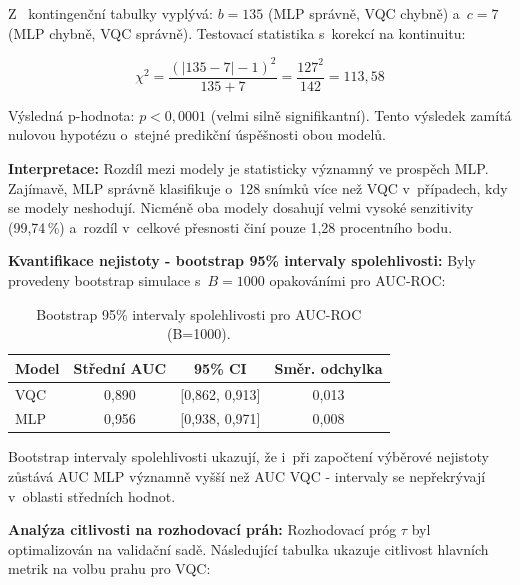 \documentclass[12pt, a4paper]{report}
\begin{document}
Z ~kontingenční tabulky vyplývá: $b = 135$ (MLP správně, VQC chybně) a~$c = 7$ (MLP chybně, VQC správně). Testovací statistika s~korekcí na kontinuitu:

\begin{equation}
    \chi^2 = \frac{(|135 - 7| - 1)^2}{135 + 7} = \frac{127^2}{142} = 113{,}58
\end{equation}

Výsledná p-hodnota: $p < 0{,}0001$ (velmi silně signifikantní). Tento výsledek zamítá nulovou hypotézu o~stejné predikční úspěšnosti obou modelů.

\textbf{Interpretace:} Rozdíl mezi modely je statisticky významný ve prospěch MLP. Zajímavě, MLP správně klasifikuje o~128 snímků více než VQC v~případech, kdy se modely neshodují. Nicméně oba modely dosahují velmi vysoké senzitivity (99,74\,\%) a~rozdíl v~celkové přesnosti činí pouze 1,28 procentního bodu.

\textbf{Kvantifikace nejistoty - bootstrap 95\% intervaly spolehlivosti:}
Byly provedeny bootstrap simulace s~$B = 1000$ opakováními pro AUC-ROC:

\begin{table}[htbp]
    \centering
    \caption{Bootstrap 95\% intervaly spolehlivosti pro AUC-ROC (B=1000).}
    \label{tab:bootstrap_ci}
    \begin{tabular}{|l|c|c|c|}
        \hline
        \textbf{Model} & \textbf{Střední AUC} & \textbf{95\% CI} & \textbf{Směr. odchylka} \\
        \hline
        VQC & 0{,}890 & [0{,}862, 0{,}913] & 0{,}013 \\
        \hline
        MLP & 0{,}956 & [0{,}938, 0{,}971] & 0{,}008 \\
        \hline
    \end{tabular}
\end{table}

Bootstrap intervaly spolehlivosti ukazují, že i~při započtení výběrové nejistoty zůstává AUC MLP významně vyšší než AUC VQC - intervaly se nepřekrývají v~oblasti středních hodnot.

\textbf{Analýza citlivosti na rozhodovací práh:}
Rozhodovací próg $\tau$ byl optimalizován na validační sadě. Následující tabulka ukazuje citlivost hlavních metrik na volbu prahu pro VQC:
\end{document}
